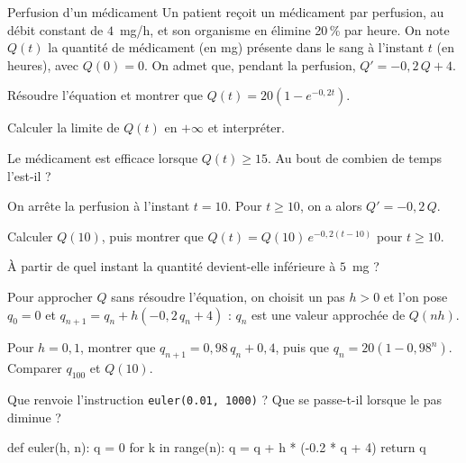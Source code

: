 \begin{exercice}[3]{Perfusion d'un médicament}
Un patient reçoit un médicament par perfusion, au débit constant de $4$~mg/h, et son organisme en élimine 20\,\% par heure.
On note $Q(t)$ la quantité de médicament (en mg) présente dans le sang à l'instant $t$ (en heures), avec $Q(0)=0$. On admet
que, pendant la perfusion, $Q'=-0{,}2\,Q+4$.
\begin{questions}
  \item Résoudre l'équation et montrer que $Q(t)=20\left(1-e^{-0{,}2t}\right)$.
  \item Calculer la limite de $Q(t)$ en $+\infty$ et interpréter.
  \item Le médicament est efficace lorsque $Q(t)\geq15$. Au bout de combien de temps l'est-il ?
\end{questions}
On arrête la perfusion à l'instant $t=10$. Pour $t\geq10$, on a alors $Q'=-0{,}2\,Q$.
\begin{questions}[resume]
  \item Calculer $Q(10)$, puis montrer que $Q(t)=Q(10)\,e^{-0{,}2(t-10)}$ pour $t\geq10$.
  \item À partir de quel instant la quantité devient-elle inférieure à $5$~mg ?
\end{questions}
Pour approcher $Q$ sans résoudre l'équation, on choisit un pas $h>0$ et l'on pose $q_0=0$ et $q_{n+1}=q_n+h\left(-0{,}2\,q_n+4\right)$ :
$q_n$ est une valeur approchée de $Q(nh)$.
\begin{questions}[resume]
  \item Pour $h=0{,}1$, montrer que $q_{n+1}=0{,}98\,q_n+0{,}4$, puis que $q_n=20\left(1-0{,}98^{n}\right)$. Comparer $q_{100}$ et $Q(10)$.
  \item Que renvoie l'instruction \texttt{euler(0.01, 1000)} ? Que se passe-t-il lorsque le pas diminue ?
\begin{python}
def euler(h, n):
    q = 0
    for k in range(n):
        q = q + h * (-0.2 * q + 4)
    return q
\end{python}
\end{questions}
\end{exercice}

